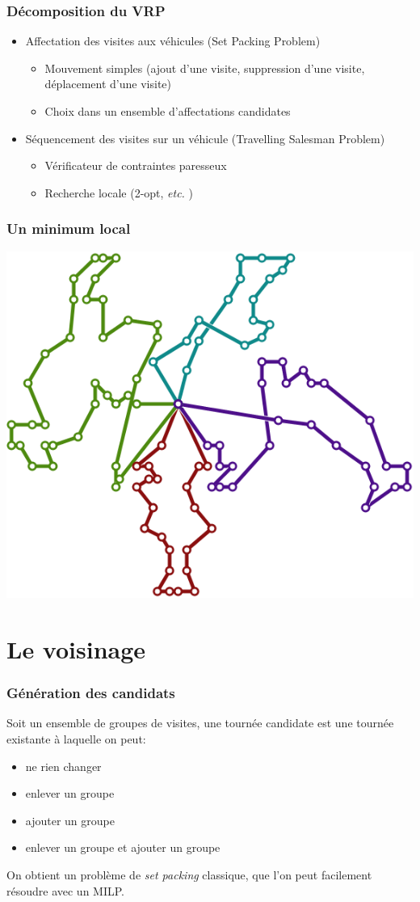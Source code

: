 \documentclass[table]{beamer}
\newcommand*{\foreign}[2][english]{%
    \emph{\foreignlanguage{#1}{#2}}%
}
\begin{document}
\begin{frame}
  \frametitle{Décomposition du VRP}

  \begin{itemize}
  \item Affectation des visites aux véhicules (Set Packing Problem)
    \begin{itemize}
    \item Mouvement simples (ajout d'une visite, suppression d'une
      visite, déplacement d'une visite)
    \item Choix dans un ensemble d'affectations candidates
    \end{itemize}
  \item Séquencement des visites sur un véhicule (Travelling Salesman Problem)
    \begin{itemize}
    \item Vérificateur de contraintes paresseux
    \item Recherche locale (2-opt, \foreign{etc.})
    \end{itemize}
  \end{itemize}
\end{frame}

\begin{frame}
  \frametitle{Un minimum local}

  \centering
  \includegraphics[width=0.7\linewidth]{../article/images/C203-2}
\end{frame}

\section{Le voisinage}

\begin{frame}
  \frametitle{Génération des candidats}

  Soit un ensemble de groupes de visites, une tournée candidate est
  une tournée existante à laquelle on peut:
  \begin{itemize}
  \item ne rien changer
  \item enlever un groupe
  \item ajouter un groupe
  \item enlever un groupe et ajouter un groupe
  \end{itemize}

  On obtient un problème de \foreign{set packing} classique, que l'on peut
  facilement résoudre avec un MILP.
\end{frame}
\end{document}
